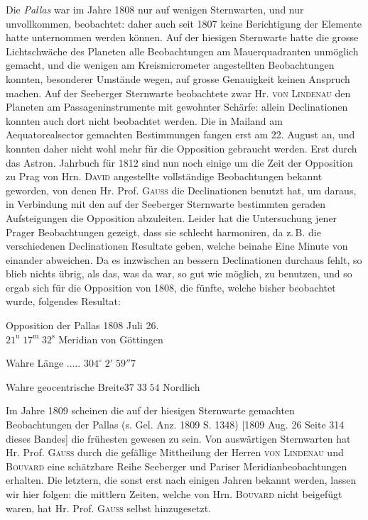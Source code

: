 \par\indent Die \emph{Pallas} war im Jahre 1808 nur auf wenigen Sternwarten, und nur unvollkommen, beobachtet: daher auch seit 1807 keine Berichtigung der Elemente hatte unternommen werden können. Auf der hiesigen Sternwarte hatte die grosse Lichtschwäche des Planeten alle Beobachtungen am Mauerquadranten unmöglich gemacht, und die wenigen am Kreismicrometer angestellten Beobachtungen konnten, besonderer Umstände wegen, auf grosse Genauigkeit keinen Anspruch machen. Auf der Seeberger Sternwarte beobachtete zwar Hr. \textsc{von Lindenau} den Planeten am Passageninstrumente mit gewohnter Schärfe: allein Declinationen konnten auch dort nicht beobachtet werden. Die in Mailand am Aequatorealsector gemachten Bestimmungen fangen erst am 22. August an, und konnten daher nicht wohl mehr für die Opposition gebraucht werden. Erst durch das Astron. Jahrbuch für 1812 sind nun noch einige um die Zeit der Opposition zu Prag von Hrn. \textsc{David} angestellte vollständige Beobachtungen bekannt geworden, von denen Hr. Prof. \textsc{Gauss} die Declinationen benutzt hat, um daraus, in Verbindung mit den auf der Seeberger Sternwarte bestimmten geraden Aufsteigungen die Opposition abzuleiten. Leider hat die Untersuchung jener Prager Beobachtungen gezeigt, dass sie schlecht harmoniren, da z.\,B. die verschiedenen Declinationen Resultate geben, welche beinahe Eine Minute von einander abweichen. Da es inzwischen an bessern Declinationen durchaus fehlt, so blieb nichts übrig, als das, was da war, so gut wie möglich, zu benutzen, und so ergab sich für die Opposition von 1808, die fünfte, welche bisher beobachtet wurde, folgendes Resultat:

\begin{center}Opposition der Pallas 1808 Juli 26.\\$21^{\text{u}}\;17^{\text{m}}\;32^{\text{s}}$ Meridian von Göttingen\par Wahre Länge .\;.\;.\;.\;.\; $304^\circ\;2'\;59''7$\par Wahre geocentrische Breite\quad $37\;33\;54$ Nordlich\end{center}

\par\indent Im Jahre 1809 scheinen die auf der hiesigen Sternwarte gemachten Beobachtungen der Pallas (s. Gel. Anz. 1809 S. 1348) [1809 Aug. 26 Seite 314 dieses Bandes] die frühesten gewesen zu sein. Von auswärtigen Sternwarten hat Hr. Prof. \textsc{Gauss} durch die gefällige Mittheilung der Herren \textsc{von Lindenau} und \textsc{Bouvard} eine schätzbare Reihe Seeberger und Pariser Meridianbeobachtungen erhalten. Die letztern, die sonst erst nach einigen Jahren bekannt werden, lassen wir hier folgen: die mittlern Zeiten, welche von Hrn. \textsc{Bouvard} nicht beigefügt waren, hat Hr. Prof. \textsc{Gauss} selbst hinzugesetzt.

